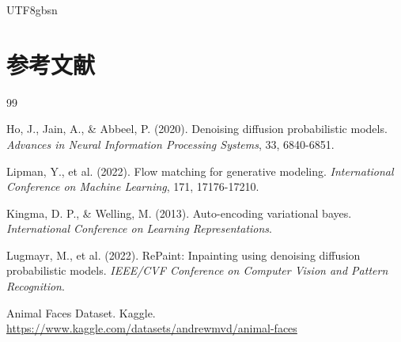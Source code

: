 \documentclass[11pt,a4paper]{article}
\begin{document}
\begin{CJK*}{UTF8}{gbsn}
\section*{参考文献}

\begin{thebibliography}{99}

Ho, J., Jain, A., & Abbeel, P. (2020).
\newblock Denoising diffusion probabilistic models.
\newblock \emph{Advances in Neural Information Processing Systems}, 33, 6840-6851.

Lipman, Y., et al. (2022).
\newblock Flow matching for generative modeling.
\newblock \emph{International Conference on Machine Learning}, 171, 17176-17210.

Kingma, D. P., & Welling, M. (2013).
\newblock Auto-encoding variational bayes.
\newblock \emph{International Conference on Learning Representations}.

Lugmayr, M., et al. (2022).
\newblock RePaint: Inpainting using denoising diffusion probabilistic models.
\newblock \emph{IEEE/CVF Conference on Computer Vision and Pattern Recognition}.

Animal Faces Dataset.
\newblock Kaggle.
\newblock \url{https://www.kaggle.com/datasets/andrewmvd/animal-faces}

\end{thebibliography}

\end{CJK*} 
\end{document}
